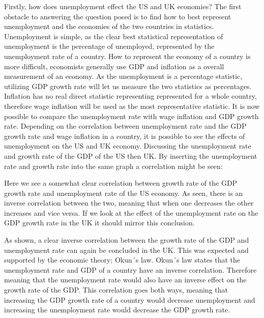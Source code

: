 Firstly, how does unemployment effect the US and UK economies?
The first obstacle to answering the question posed is to find how to best represent unemployment and the economies of the two countries in statistics.
Unemployment is simple, as the clear best statistical representation of unemployment is the percentage of unemployed, represented by the unemployment rate of a country.
How to represent the economy of a country is more difficult, economists generally use GDP and inflation as a overall measurement of an economy.
As the unemployment is a percentage statistic, utilizing GDP growth rate will let us measure the two statistics as percentages.
Inflation has no real direct statistic representing represented for a whole country, therefore wage inflation will be used as the most representative statistic.
It is now possible to compare the unemployment rate with wage inflation and GDP growth rate.
Depending on the correlation between unemployment rate and the GDP growth rate and wage inflation in a country, it is possible to see the effects of unemployment on the US and UK economy.
Discussing the unemployment rate and growth rate of the GDP of the US then UK.
By inserting the unemployment rate and growth rate into the same graph a correlation might be seen:


Here we see a somewhat clear correlation between growth rate of the GDP growth rate and unemployment rate of the US economy.
As seen, there is an inverse correlation between the two, meaning that when one decreases the other increases and vice versa.
If we look at the effect of the unemployment rate on the GDP growth rate in the UK it should mirror this conclusion.


As shown, a clear inverse correlation between the growth rate of the GDP and unemployment rate can again be concluded in the UK.
This was expected and supported by the economic theory; Okun´s law.
Okun´s law states that the unemployment rate and GDP of a country have an inverse correlation.
Therefore meaning that the unemployment rate would also have an inverse effect on the growth rate of the GDP. \cite{Economics_Okuns_Law}
This correlation goes both ways, meaning that increasing the GDP growth rate of a country would decrease unemployment and increasing the unemployment rate would decrease the GDP growth rate.


